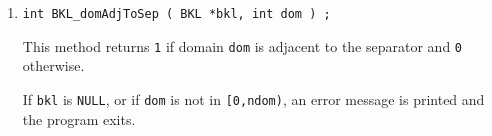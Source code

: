 \begin{enumerate}
\begin{itemize}
a pseudoperipheral domain as root
\item 
{\tt flag = 6} $\longrightarrow$ 
use {\tt domcolors[]} to seed the {\tt colors[]} array
\end{itemize}
The {\tt seed} input parameter is for a random number generator.
The {\tt domcolors[]} input array is used only for {\tt flag = 6}.
\par {}
If {\tt bkl} is {\tt NULL},
or if {\tt flag = 6} and {\tt domcolors} is {\tt NULL},
or if {\tt flag} is not in {\tt [1,6]},
an error message is printed and the program exits.
\item
\begin{verbatim}
int BKL_domAdjToSep ( BKL *bkl, int dom ) ;
\end{verbatim}
This method returns {\tt 1} 
if domain {\tt dom} is adjacent to the separator
and {\tt 0} otherwise.
\par {}
If {\tt bkl} is {\tt NULL},
or if {\tt dom} is not in {\tt [0,ndom)},
an error message is printed and the program exits.
\end{enumerate}
\par
